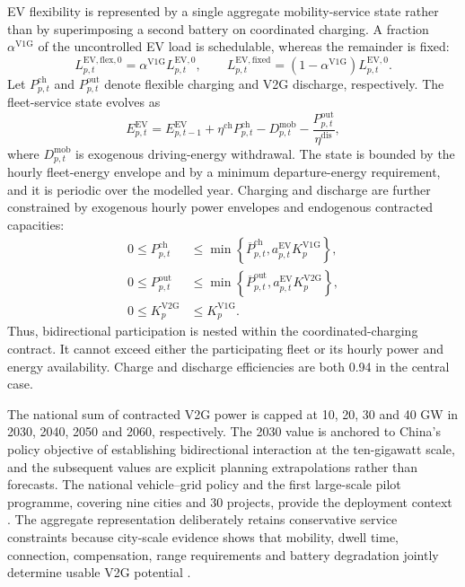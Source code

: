 \documentclass[12pt]{article}
\begin{document}
EV flexibility is represented by a single aggregate mobility-service state
rather than by superimposing a second battery on coordinated charging. A
fraction $\alpha^{\mathrm{V1G}}$ of the uncontrolled EV load is schedulable,
whereas the remainder is fixed:
\begin{equation}
  L^{\mathrm{EV,flex},0}_{p,t}
  =
  \alpha^{\mathrm{V1G}}L^{\mathrm{EV},0}_{p,t},
  \qquad
  L^{\mathrm{EV,fixed}}_{p,t}
  =
  (1-\alpha^{\mathrm{V1G}})L^{\mathrm{EV},0}_{p,t}.
\end{equation}
Let $P^{\mathrm{ch}}_{p,t}$ and $P^{\mathrm{out}}_{p,t}$ denote flexible
charging and V2G discharge, respectively. The fleet-service state evolves as
\begin{equation}
  E^{\mathrm{EV}}_{p,t}
  =
  E^{\mathrm{EV}}_{p,t-1}
  +\eta^{\mathrm{ch}}P^{\mathrm{ch}}_{p,t}
  -D^{\mathrm{mob}}_{p,t}
  -\frac{P^{\mathrm{out}}_{p,t}}{\eta^{\mathrm{dis}}},
  \label{eq:evstate}
\end{equation}
where $D^{\mathrm{mob}}_{p,t}$ is exogenous driving-energy withdrawal. The
state is bounded by the hourly fleet-energy envelope and by a minimum
departure-energy requirement, and it is periodic over the modelled year.
Charging and discharge are further constrained by exogenous hourly power
envelopes and endogenous contracted capacities:
\begin{align}
  0\le P^{\mathrm{ch}}_{p,t}
  &\le
  \min\!\left\{\overline P^{\mathrm{ch}}_{p,t},
  a^{\mathrm{EV}}_{p,t}K^{\mathrm{V1G}}_p\right\},\\
  0\le P^{\mathrm{out}}_{p,t}
  &\le
  \min\!\left\{\overline P^{\mathrm{out}}_{p,t},
  a^{\mathrm{EV}}_{p,t}K^{\mathrm{V2G}}_p\right\},\\
  0\le K^{\mathrm{V2G}}_p
  &\le K^{\mathrm{V1G}}_p.
  \label{eq:evpower}
\end{align}
Thus, bidirectional participation is nested within the coordinated-charging
contract. It cannot exceed either the participating fleet or its hourly
power and energy availability. Charge and discharge efficiencies are both
0.94 in the central case.

The national sum of contracted V2G power is capped at 10, 20, 30 and 40 GW in
2030, 2040, 2050 and 2060, respectively. The 2030 value is anchored to
China's policy objective of establishing bidirectional interaction at the
ten-gigawatt scale, and the subsequent values are explicit planning
extrapolations rather than forecasts. The national vehicle--grid policy and
the first large-scale pilot programme, covering nine cities and 30 projects,
provide the deployment context
\cite{NDRCVGI2023,NDRCVGIPilot2025}. The aggregate representation deliberately
retains conservative service constraints because city-scale evidence shows
that mobility, dwell time, connection, compensation, range requirements and
battery degradation jointly determine usable V2G potential
\cite{IEAV2G2026,Li2025V2G}.
\end{document}
